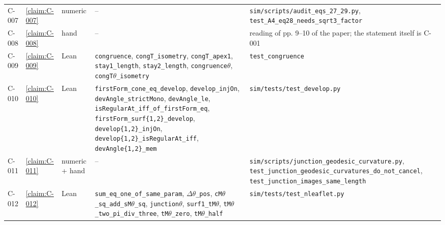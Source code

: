 \begin{longtable}{@{}l>{\raggedright}p{}>{\raggedright}p{}>{\raggedright}p{}>{\raggedright\arraybackslash}p{}@{}}
C-007 & \cref{claim:C-007} & numeric & -- & \texttt{sim/\allowbreak{}scripts/\allowbreak{}audit\_\allowbreak{}eqs\_\allowbreak{}27\_\allowbreak{}29.\allowbreak{}py}, \texttt{test\_\allowbreak{}A4\_\allowbreak{}eq28\_\allowbreak{}needs\_\allowbreak{}sqrt3\_\allowbreak{}factor}\\
C-008 & \cref{claim:C-008} & hand & -- & reading of pp.\allowbreak{} 9–10 of the paper; the statement itself is C-001\\
C-009 & \cref{claim:C-009} & Lean & \texttt{congruence}, \texttt{congT\_\allowbreak{}isometry}, \texttt{congT\_\allowbreak{}apex1}, \texttt{stay1\_\allowbreak{}length}, \texttt{stay2\_\allowbreak{}length}, \texttt{congruence\ensuremath{\theta}}, \texttt{congT\ensuremath{\theta}\_\allowbreak{}isometry} & \texttt{test\_\allowbreak{}congruence}\\
C-010 & \cref{claim:C-010} & Lean & \texttt{firstForm\_\allowbreak{}cone\_\allowbreak{}eq\_\allowbreak{}develop}, \texttt{develop\_\allowbreak{}injOn}, \texttt{devAngle\_\allowbreak{}strictMono}, \texttt{devAngle\_\allowbreak{}le}, \texttt{isRegularAt\_\allowbreak{}iff\_\allowbreak{}of\_\allowbreak{}firstForm\_\allowbreak{}eq}, \texttt{firstForm\_\allowbreak{}surf\{1,2\}\_\allowbreak{}develop}, \texttt{develop\{1,2\}\_\allowbreak{}injOn}, \texttt{develop\{1,2\}\_\allowbreak{}isRegularAt\_\allowbreak{}iff}, \texttt{devAngle\{1,2\}\_\allowbreak{}mem} & \texttt{sim/\allowbreak{}tests/\allowbreak{}test\_\allowbreak{}develop.\allowbreak{}py}\\
C-011 & \cref{claim:C-011} & numeric + hand & -- & \texttt{sim/\allowbreak{}scripts/\allowbreak{}junction\_\allowbreak{}geodesic\_\allowbreak{}curvature.\allowbreak{}py}, \texttt{test\_\allowbreak{}junction\_\allowbreak{}geodesic\_\allowbreak{}curvatures\_\allowbreak{}do\_\allowbreak{}not\_\allowbreak{}cancel}, \texttt{test\_\allowbreak{}junction\_\allowbreak{}images\_\allowbreak{}same\_\allowbreak{}length}\\
C-012 & \cref{claim:C-012} & Lean & \texttt{sum\_\allowbreak{}eq\_\allowbreak{}one\_\allowbreak{}of\_\allowbreak{}same\_\allowbreak{}param}, \texttt{\ensuremath{\Delta}\ensuremath{\theta}\_\allowbreak{}pos}, \texttt{cM\ensuremath{\theta}\_\allowbreak{}sq\_\allowbreak{}add\_\allowbreak{}sM\ensuremath{\theta}\_\allowbreak{}sq}, \texttt{junction\ensuremath{\theta}}, \texttt{surf1\_\allowbreak{}tM\ensuremath{\theta}}, \texttt{tM\ensuremath{\theta}\_\allowbreak{}two\_\allowbreak{}pi\_\allowbreak{}div\_\allowbreak{}three}, \texttt{tM\ensuremath{\theta}\_\allowbreak{}zero}, \texttt{tM\ensuremath{\theta}\_\allowbreak{}half} & \texttt{sim/\allowbreak{}tests/\allowbreak{}test\_\allowbreak{}nleaflet.\allowbreak{}py}\\

\end{longtable}
